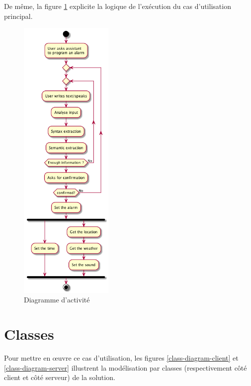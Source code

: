 De même, la figure \ref{activity-diagram} explicite la logique de l'exécution du cas d'utilisation principal.

\begin{figure}[!h]
    \centering
    \includegraphics[width=0.4\textwidth]{../docs/conception/build/activityDiagram.png}
    \caption{Diagramme d'activité}
    \label{activity-diagram}
\end{figure}


\section{Classes}

Pour mettre en œuvre ce cas d'utilisation, les figures \ref{class-diagram-client} et \ref{class-diagram-server}
illustrent la modélisation par classes (respectivement côté client et côté serveur) de la solution.

